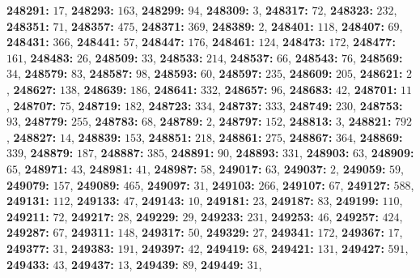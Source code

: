 \textsf{\bfseries 248291:} $17$, \textsf{\bfseries 248293:} $163$, \textsf{\bfseries 248299:} $94$, \textsf{\bfseries 248309:} $3$, \textsf{\bfseries 248317:} $72$, \textsf{\bfseries 248323:} $232$, \textsf{\bfseries 248351:} $71$, \textsf{\bfseries 248357:} $475$, \textsf{\bfseries 248371:} $369$, \textsf{\bfseries 248389:} $2$, \textsf{\bfseries 248401:} $118$, \textsf{\bfseries 248407:} $69$, \textsf{\bfseries 248431:} $366$, \textsf{\bfseries 248441:} $57$, \textsf{\bfseries 248447:} $176$, \textsf{\bfseries 248461:} $124$, \textsf{\bfseries 248473:} $172$, \textsf{\bfseries 248477:} $161$, \textsf{\bfseries 248483:} $26$, \textsf{\bfseries 248509:} $33$, \textsf{\bfseries 248533:} $214$, \textsf{\bfseries 248537:} $66$, \textsf{\bfseries 248543:} $76$, \textsf{\bfseries 248569:} $34$, \textsf{\bfseries 248579:} $83$, \textsf{\bfseries 248587:} $98$, \textsf{\bfseries 248593:} $60$, \textsf{\bfseries 248597:} $235$, \textsf{\bfseries 248609:} $205$, \textsf{\bfseries 248621:} $2$, \textsf{\bfseries 248627:} $138$, \textsf{\bfseries 248639:} $186$, \textsf{\bfseries 248641:} $332$, \textsf{\bfseries 248657:} $96$, \textsf{\bfseries 248683:} $42$, \textsf{\bfseries 248701:} $11$, \textsf{\bfseries 248707:} $75$, \textsf{\bfseries 248719:} $182$, \textsf{\bfseries 248723:} $334$, \textsf{\bfseries 248737:} $333$, \textsf{\bfseries 248749:} $230$, \textsf{\bfseries 248753:} $93$, \textsf{\bfseries 248779:} $255$, \textsf{\bfseries 248783:} $68$, \textsf{\bfseries 248789:} $2$, \textsf{\bfseries 248797:} $152$, \textsf{\bfseries 248813:} $3$, \textsf{\bfseries 248821:} $792$, \textsf{\bfseries 248827:} $14$, \textsf{\bfseries 248839:} $153$, \textsf{\bfseries 248851:} $218$, \textsf{\bfseries 248861:} $275$, \textsf{\bfseries 248867:} $364$, \textsf{\bfseries 248869:} $339$, \textsf{\bfseries 248879:} $187$, \textsf{\bfseries 248887:} $385$, \textsf{\bfseries 248891:} $90$, \textsf{\bfseries 248893:} $331$, \textsf{\bfseries 248903:} $63$, \textsf{\bfseries 248909:} $65$, \textsf{\bfseries 248971:} $43$, \textsf{\bfseries 248981:} $41$, \textsf{\bfseries 248987:} $58$, \textsf{\bfseries 249017:} $63$, \textsf{\bfseries 249037:} $2$, \textsf{\bfseries 249059:} $59$, \textsf{\bfseries 249079:} $157$, \textsf{\bfseries 249089:} $465$, \textsf{\bfseries 249097:} $31$, \textsf{\bfseries 249103:} $266$, \textsf{\bfseries 249107:} $67$, \textsf{\bfseries 249127:} $588$, \textsf{\bfseries 249131:} $112$, \textsf{\bfseries 249133:} $47$, \textsf{\bfseries 249143:} $10$, \textsf{\bfseries 249181:} $23$, \textsf{\bfseries 249187:} $83$, \textsf{\bfseries 249199:} $110$, \textsf{\bfseries 249211:} $72$, \textsf{\bfseries 249217:} $28$, \textsf{\bfseries 249229:} $29$, \textsf{\bfseries 249233:} $231$, \textsf{\bfseries 249253:} $46$, \textsf{\bfseries 249257:} $424$, \textsf{\bfseries 249287:} $67$, \textsf{\bfseries 249311:} $148$, \textsf{\bfseries 249317:} $50$, \textsf{\bfseries 249329:} $27$, \textsf{\bfseries 249341:} $172$, \textsf{\bfseries 249367:} $17$, \textsf{\bfseries 249377:} $31$, \textsf{\bfseries 249383:} $191$, \textsf{\bfseries 249397:} $42$, \textsf{\bfseries 249419:} $68$, \textsf{\bfseries 249421:} $131$, \textsf{\bfseries 249427:} $591$, \textsf{\bfseries 249433:} $43$, \textsf{\bfseries 249437:} $13$, \textsf{\bfseries 249439:} $89$, \textsf{\bfseries 249449:} $31$, 
